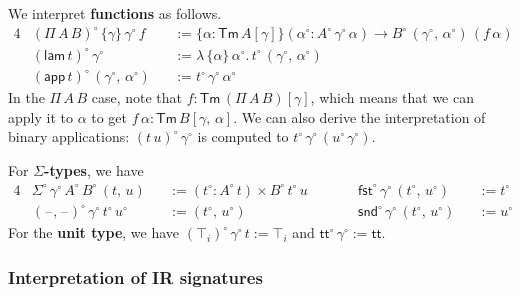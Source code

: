 \documentclass[acmsmall,screen,review,anonymous]{acmart}
\newcommand{\msf}[1]{{\mathsf{#1}}}
\newcommand{\ttt}{\msf{tt}}
\newcommand{\blank}{{\mathord{\hspace{1pt}\text{--}\hspace{1pt}}}}
\newcommand{\fst}{\msf{fst}}
\newcommand{\snd}{\msf{snd}}
\newcommand{\Tm}{\msf{Tm}}
\newcommand{\w}{\circ}
\newcommand{\lam}{\msf{lam}}
\newcommand{\app}{\msf{app}}
\begin{document}
We interpret \textbf{functions} as follows.
\begin{alignat*}{4}
  &(\Pi\,A\,B)^\w\,\{\gamma\}\,\gamma^\w\,f &&:= \{\alpha : \Tm\,A[\gamma]\}(\alpha^\w : A^\w\,\gamma^\w\,\alpha) \to B^\w\,(\gamma^\w,\,\alpha^\w)\,(f\,\alpha)\\
  &(\lam\,t)^\w\,\gamma^\w &&:= \lambda\,\{\alpha\}\,\alpha^\w.\,t^\w\,(\gamma^\w,\,\alpha^\w)\\
  &(\app\,t)^\w\,(\gamma^\w,\,\alpha^\w) &&:= t^\w\,\gamma^\w\,\alpha^\w
\end{alignat*}
In the $\Pi\,A\,B$ case, note that $f : \Tm\,(\Pi\,A\,B)[\gamma]$, which means that we can apply it
to $\alpha$ to get $f\,\alpha : \Tm\,B[\gamma,\,\alpha]$. We can also derive the interpretation of
binary applications: $(t\,u)^\w\,\gamma^\w$ is computed to $t^\w\,\gamma^\w\,(u^\w\,\gamma^\w)$.

For \textbf{$\Sigma$-types}, we have
\begin{alignat*}{4}
  &\Sigma^\w\,\gamma^\w\,A^\w\,B^\w\,(t,\,u)   &&:= (t^\w : A^\w\,t) \times B^\w\,t^\w\,u\hspace{2em}  && \fst^\w\,\gamma^\w\,(t^\w,\,u^\w) &&:= t^\w \\
  &(\blank,\blank)^\w\,\gamma^\w\,t^\w\,u^\w   &&:= (t^\w,\,u^\w)                                     && \snd^\w\,\gamma^\w\,(t^\w,\,u^\w) &&:= u^\w
\end{alignat*}
For the \textbf{unit type}, we have $(\top_i)^\w\,\gamma^\w\,t := \top_i$ and $\ttt^\w\,\gamma^\w := \ttt$.

\subsubsection{Interpretation of IR signatures}\label{sec:ir-signatures-canonicity}
\end{document}
